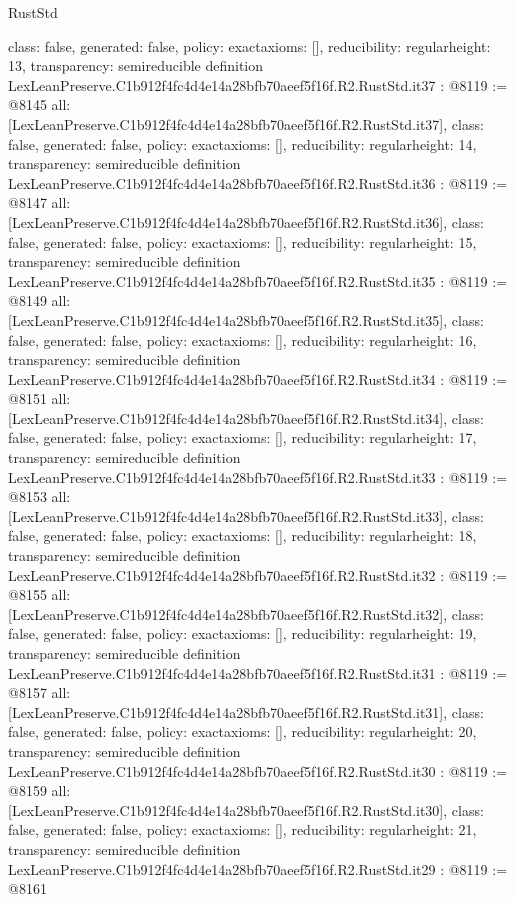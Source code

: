 \begin{lexlean}{RustStd}
\begin{coremodule}
{  class: false,
  generated: false,
  policy: exact{axioms: []},
  reducibility: regular{height: 13},
  transparency: semireducible
}
definition LexLeanPreserve.C1b912f4fc4d4e14a28bfb70aeef5f16f.R2.RustStd.it37 : @8119 := @8145 {
  all: [LexLeanPreserve.C1b912f4fc4d4e14a28bfb70aeef5f16f.R2.RustStd.it37],
  class: false,
  generated: false,
  policy: exact{axioms: []},
  reducibility: regular{height: 14},
  transparency: semireducible
}
definition LexLeanPreserve.C1b912f4fc4d4e14a28bfb70aeef5f16f.R2.RustStd.it36 : @8119 := @8147 {
  all: [LexLeanPreserve.C1b912f4fc4d4e14a28bfb70aeef5f16f.R2.RustStd.it36],
  class: false,
  generated: false,
  policy: exact{axioms: []},
  reducibility: regular{height: 15},
  transparency: semireducible
}
definition LexLeanPreserve.C1b912f4fc4d4e14a28bfb70aeef5f16f.R2.RustStd.it35 : @8119 := @8149 {
  all: [LexLeanPreserve.C1b912f4fc4d4e14a28bfb70aeef5f16f.R2.RustStd.it35],
  class: false,
  generated: false,
  policy: exact{axioms: []},
  reducibility: regular{height: 16},
  transparency: semireducible
}
definition LexLeanPreserve.C1b912f4fc4d4e14a28bfb70aeef5f16f.R2.RustStd.it34 : @8119 := @8151 {
  all: [LexLeanPreserve.C1b912f4fc4d4e14a28bfb70aeef5f16f.R2.RustStd.it34],
  class: false,
  generated: false,
  policy: exact{axioms: []},
  reducibility: regular{height: 17},
  transparency: semireducible
}
definition LexLeanPreserve.C1b912f4fc4d4e14a28bfb70aeef5f16f.R2.RustStd.it33 : @8119 := @8153 {
  all: [LexLeanPreserve.C1b912f4fc4d4e14a28bfb70aeef5f16f.R2.RustStd.it33],
  class: false,
  generated: false,
  policy: exact{axioms: []},
  reducibility: regular{height: 18},
  transparency: semireducible
}
definition LexLeanPreserve.C1b912f4fc4d4e14a28bfb70aeef5f16f.R2.RustStd.it32 : @8119 := @8155 {
  all: [LexLeanPreserve.C1b912f4fc4d4e14a28bfb70aeef5f16f.R2.RustStd.it32],
  class: false,
  generated: false,
  policy: exact{axioms: []},
  reducibility: regular{height: 19},
  transparency: semireducible
}
definition LexLeanPreserve.C1b912f4fc4d4e14a28bfb70aeef5f16f.R2.RustStd.it31 : @8119 := @8157 {
  all: [LexLeanPreserve.C1b912f4fc4d4e14a28bfb70aeef5f16f.R2.RustStd.it31],
  class: false,
  generated: false,
  policy: exact{axioms: []},
  reducibility: regular{height: 20},
  transparency: semireducible
}
definition LexLeanPreserve.C1b912f4fc4d4e14a28bfb70aeef5f16f.R2.RustStd.it30 : @8119 := @8159 {
  all: [LexLeanPreserve.C1b912f4fc4d4e14a28bfb70aeef5f16f.R2.RustStd.it30],
  class: false,
  generated: false,
  policy: exact{axioms: []},
  reducibility: regular{height: 21},
  transparency: semireducible
}
definition LexLeanPreserve.C1b912f4fc4d4e14a28bfb70aeef5f16f.R2.RustStd.it29 : @8119 := @8161 {
}
\end{coremodule}
\end{lexlean}
